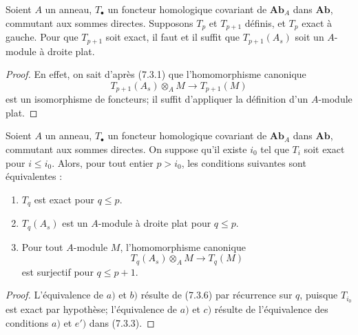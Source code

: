 \begin{lemma}[7.3.6]
Soient $A$ un anneau, $T_\bullet$ un foncteur homologique covariant de
$\mathbf{Ab}_A$ dans $\mathbf{Ab}$, commutant aux sommes directes. Supposons
$T_p$ et $T_{p+1}$ définis, et $T_p$ exact à gauche. Pour que $T_{p+1}$ soit
exact, il faut et il suffit que $T_{p+1}(A_s)$ soit un $A$-module à droite
plat.
\end{lemma}

\begin{proof}
En effet, on sait d'après (7.3.1) que l'homomorphisme canonique
\[
  T_{p+1}(A_s)\otimes_A M\longrightarrow T_{p+1}(M)
\]
est un isomorphisme de foncteurs; il suffit d'appliquer la définition d'un
$A$-module plat.
\end{proof}

\begin{proposition}[7.3.7]
Soient $A$ un anneau, $T_\bullet$ un foncteur homologique covariant de
$\mathbf{Ab}_A$ dans $\mathbf{Ab}$, commutant aux sommes directes. On suppose
qu'il existe $i_0$ tel que $T_i$ soit exact pour $i\leq i_0$. Alors, pour tout
entier $p>i_0$, les conditions suivantes sont équivalentes :
\begin{enumerate}
  \item[a)] $T_q$ est exact pour $q\leq p$.
  \item[b)] $T_q(A_s)$ est un $A$-module à droite plat pour $q\leq p$.
  \item[c)] Pour tout $A$-module $M$, l'homomorphisme canonique
    \[
      T_q(A_s)\otimes_A M\longrightarrow T_q(M)
    \]
    est surjectif pour $q\leq p+1$.
\end{enumerate}
\end{proposition}

\begin{proof}
L'équivalence de $a)$ et $b)$ résulte de (7.3.6) par récurrence sur $q$,
puisque $T_{i_0}$ est exact par hypothèse; l'équivalence de $a)$ et $c)$
résulte de l'équivalence des conditions $a)$ et $e')$ dans (7.3.3).
\end{proof}

